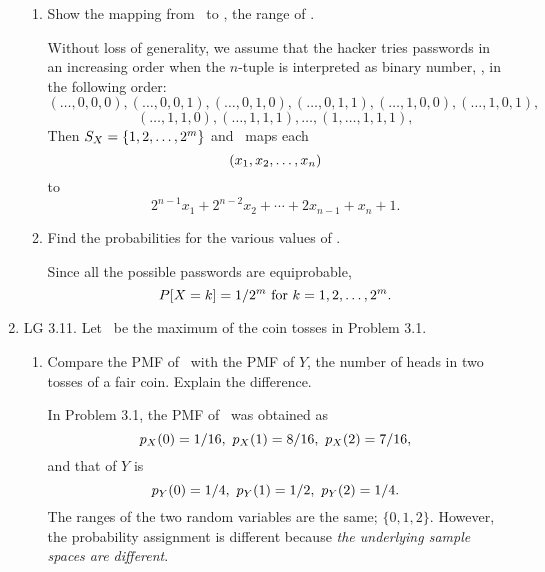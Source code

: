 \begin{enumerate}
\begin{enumerate}
		\item Show the mapping from \sspace\ to \ssx, the range of \X.
		\ifdefined\sol
		\begin{solution}
			Without loss of generality,
			we assume that the hacker tries
			passwords in an increasing order
			when the $n$-tuple is interpreted as binary number,
			\ie, in the following order:
			\[
				(\ldots,0,0,0),
				(\ldots,0,0,1),
				(\ldots,0,1,0),
				(\ldots,0,1,1),
				(\ldots,1,0,0),
				(\ldots,1,0,1),
			\]
			\[
				(\ldots,1,1,0),
				(\ldots,1,1,1),
				\ldots,
				(1,\ldots,1,1,1),
				\]
			Then $S_X = \{1,2,\ldots, 2^m\}$
			and \X\ maps each \[({x}_1, {x}_2, \ldots, {x}_{n} )\]
			to \[2^{n-1}x_1 + 2^{n-2} x_2 + \cdots + 2 x_{n-1} + x_{n} + 1.\]

		\end{solution}
		\fi


		\item Find the probabilities for the various values of \X.
		\ifdefined\sol
		\begin{solution}
			Since all the possible passwords are equiprobable,
			\[
				P[X=k] = 1/2^m
				\mbox{ for } k =1,2,\ldots,2^m.
			\]

		\end{solution}
		\fi

	\end{enumerate}

	\item LG 3.11.
	Let \X\ be the maximum of the coin tosses in Problem 3.1.
	\begin{enumerate}
		\item Compare the PMF of \X\ with the PMF of $Y$,
		the number of heads in two tosses of a fair coin.
		Explain the difference.
		\ifdefined\sol
		\begin{solution}
			In Problem 3.1, 
			the PMF of \X\ was obtained as
			\[
				p_{X}(0) = 1/16,\
				p_{X}(1) = 8/16,\
				p_{X}(2) = 7/16,
			\]
			and that of $Y$ is
			\[
				p_{Y}(0) = 1/4,\
				p_{Y}(1) = 1/2,\
				p_{Y}(2) = 1/4.
			\]
			The ranges of the two random variables
			are the same; $\{0,1,2\}$.
			However, the probability assignment is different
			because \emph{the underlying sample spaces are different}.
	
		\end{solution}
		\fi


\end{enumerate}
\end{enumerate}
